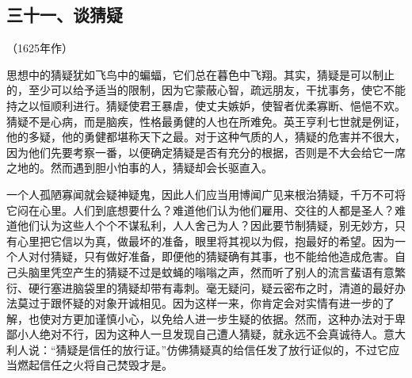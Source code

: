 \subsection*{三十一、谈猜疑}
\begin{center}
    （1625年作）
\end{center}
\par 思想中的猜疑犹如飞鸟中的蝙蝠，它们总在暮色中飞翔。其实，猜疑是可以制止的，至少可以给予适当的限制，因为它蒙蔽心智，疏远朋友，干扰事务，使它不能持之以恒顺利进行。猜疑使君王暴虐，使丈夫嫉妒，使智者优柔寡断、悒悒不欢。猜疑不是心病，而是脑疾，性格最勇健的人也在所难免。英王亨利七世就是例证，他的多疑，他的勇健都堪称天下之最。对于这种气质的人，猜疑的危害并不很大，因为他们先要考察一番，以便确定猜疑是否有充分的根据，否则是不大会给它一席之地的。然而遇到胆小怕事的人，猜疑却会长驱直入。
\par 一个人孤陋寡闻就会疑神疑鬼，因此人们应当用博闻广见来根治猜疑，千万不可将它闷在心里。人们到底想要什么？难道他们认为他们雇用、交往的人都是圣人？难道他们认为这些人个个不谋私利，人人舍己为人？因此要节制猜疑，别无妙方，只有心里把它信以为真，做最坏的准备，眼里将其视以为假，抱最好的希望。因为一个人对付猜疑，只有做好准备，即便他的猜疑确有其事，也不能给他造成危害。自己头脑里凭空产生的猜疑不过是蚊蝇的嗡嗡之声，然而听了别人的流言蜚语有意繁衍、硬行塞进脑袋里的猜疑却带有毒刺。毫无疑问，疑云密布之时，清道的最好办法莫过于跟怀疑的对象开诚相见。因为这样一来，你肯定会对实情有进一步的了解，也使对方更加谨慎小心，以免给人进一步生疑的依据。然而，这种办法对于卑鄙小人绝对不行，因为这种人一旦发现自己遭人猜疑，就永远不会真诚待人。意大利人说：“猜疑是信任的放行证。”仿佛猜疑真的给信任发了放行证似的，不过它应当燃起信任之火将自己焚毁才是。




